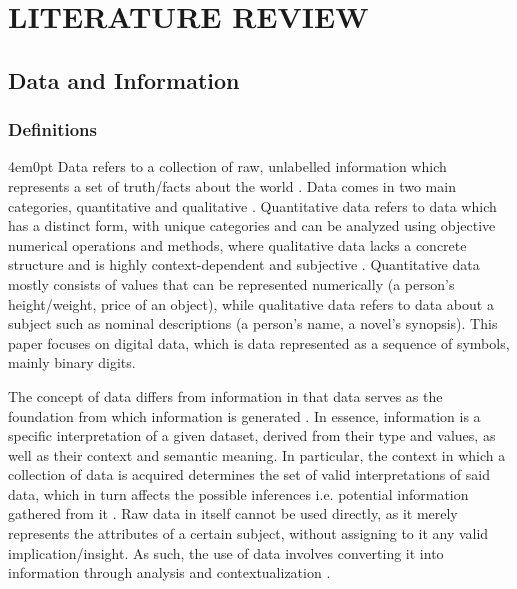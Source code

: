 \renewcommand{\thechapter}{\Roman{chapter}}
\chapter[]{LITERATURE REVIEW}
\renewcommand{\thechapter}{\arabic{chapter}}

\begingroup
\fontsize{12bp}{\baselineskip}\selectfont

\section{Data and Information}
	\subsection{Definitions}
		\begin{indentedblock}{4em}{0pt}
			Data refers to a collection of raw, unlabelled information which represents a set of truth/facts about the world \parencite{what_are_data_olson_karin}. Data comes in two main categories, quantitative and qualitative \parencite{what_are_data_lucina}. Quantitative data refers to data which has a distinct form, with unique categories and can be analyzed using objective numerical operations and methods, where qualitative data lacks a concrete structure and is highly context-dependent and subjective \parencite{quantitative_vs_qualitative_judith}. Quantitative data mostly consists of values that can be represented numerically (a person's height/weight, price of an object), while qualitative data refers to data about a subject such as nominal descriptions (a person's name, a novel's synopsis). This paper focuses on digital data, which is data represented as a sequence of symbols, mainly binary digits.
			
			
			The concept of data differs from information in that data serves as the foundation from which information is generated \parencite{what_are_data_lucina}. In essence, information is a specific interpretation of a given dataset, derived from their type and values, as well as their context and semantic meaning. In particular, the context in which a collection of data is acquired determines the set of valid interpretations of said data, which in turn affects the possible inferences i.e. potential information gathered from it \parencite{data_vs_information_mason}. Raw data in itself cannot be used directly, as it merely represents the attributes of a certain subject, without assigning to it any valid implication/insight. As such, the use of data involves converting it into information through analysis and contextualization \parencite{data_transformation_sanae_borrohou_et_al}.
			

\end{indentedblock}
